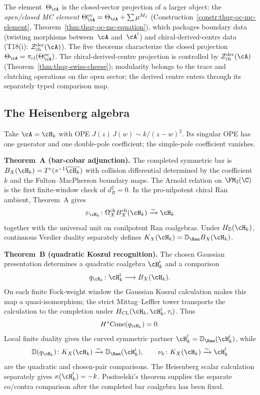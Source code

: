 The element~$\Theta_\cA$ is the closed-sector projection
of a larger object: the \emph{open/closed MC element}
$\Theta^{\mathrm{oc}}_\cA = \Theta_\cA + \sum \mu^{M_j}$
(Construction~\ref{constr:thqg-oc-mc-element},
Theorem~\ref{thm:thqg-oc-mc-equation}),
which packages boundary data (twisting morphisms
between~$\cA$ and~$\cA^!$) and chiral-derived-centre data
(T18(i): $\mathcal{Z}^{\mathrm{der}}_{\mathrm{ch}}(\cA)$).
The five theorems characterize the closed projection
$\Theta_\cA = \pi_{\mathrm{cl}}(\Theta^{\mathrm{oc}}_\cA)$. The
chiral-derived-centre projection is controlled by
$\mathcal{Z}^{\mathrm{der}}_{\mathrm{ch}}(\cA)$
(Theorem~\ref{thm:thqg-swiss-cheese});
modularity belongs to the
trace and clutching operations on the open sector; the derived centre
enters through its separately typed comparison map.

\subsection{The Heisenberg algebra}
\label{subsec:five-theorems-heisenberg}

Take $\cA = \cH_k$ with OPE
$J(z)\,J(w) \sim k/(z-w)^2$.  Its singular OPE has one generator and
one double-pole coefficient; the simple-pole coefficient vanishes.

\smallskip
\noindent\textbf{Theorem~A (bar-cobar adjunction).}\enspace
The completed symmetric bar is
$B_X(\cH_k)=T^c(s^{-1}\overline{\cH_k})$ with collision differential
determined by the coefficient~$k$ and the Fulton--MacPherson boundary
maps.  The Arnold relation on $\FM_3(\C)$ is the first finite-window
check of $d_B^2=0$.  In the pro-nilpotent chiral Ran ambient,
Theorem~A gives
\[
\varepsilon_{\cH_k}\colon
\Omega_X^{\mathrm{ch}}B_X^{\mathrm{ch}}(\cH_k)
\xrightarrow{\sim}\cH_k
\]
together with the universal unit on conilpotent Ran coalgebras.
Under $H_{\mathbb D}(\cH_k)$, continuous Verdier duality separately
defines $K_X(\cH_k)=\mathbb D_{\Ran}B_X(\cH_k)$.

\smallskip
\noindent\textbf{Theorem~B (quadratic Koszul recognition).}\enspace
The chosen Gaussian presentation determines a quadratic coalgebra
$\cH_k^{\mathrm i}$ and a comparison
\[
q_{\cH_k}\colon\cH_k^{\mathrm i}\longrightarrow B_X(\cH_k).
\]
On each finite Fock-weight window the Gaussian Koszul calculation
makes this map a quasi-isomorphism; the strict Mittag--Leffler tower
transports the calculation to the completion under
$H_{\mathrm{CL}}(\cH_k,\cH_k^{\mathrm i},\tau_{\mathrm i})$.  Thus
\[
H^*\!\operatorname{Cone}(q_{\cH_k})=0.
\]
Local finite duality gives the curved symmetric partner
$\cH_k^!=\mathbb D_{\Ran}(\cH_k^{\mathrm i})$, while
\[
\mathbb D(q_{\cH_k})\colon K_X(\cH_k)\xrightarrow{\sim}
\mathbb D_{\Ran}(\cH_k^{\mathrm i}),\qquad
\nu_k\colon K_X(\cH_k)\xrightarrow{\sim}\cH_k^!
\]
are the quadratic and chosen-pair comparisons.  The Heisenberg scalar
calculation separately gives $\kappa(\cH_k^!)=-k$.
Positselski's theorem supplies the separate
co/contra comparison after the completed bar coalgebra has been
fixed.

